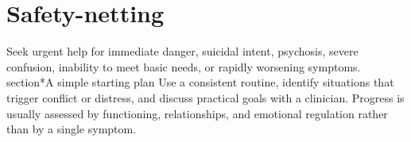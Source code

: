 \section*{Safety-netting}
Seek urgent help for immediate danger, suicidal intent, psychosis, severe confusion, inability to meet basic needs, or rapidly worsening symptoms.
section*{A simple starting plan}
Use a consistent routine, identify situations that trigger conflict or distress, and discuss practical goals with a clinician. Progress is usually assessed by functioning, relationships, and emotional regulation rather than by a single symptom.

\clearpage
